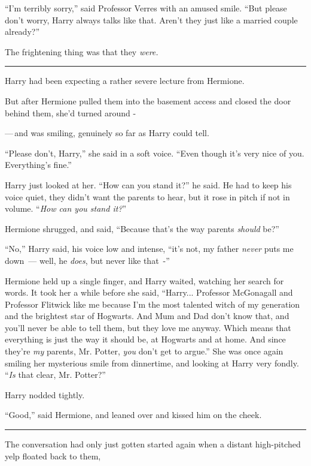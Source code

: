 ``I'm terribly sorry,'' said Professor Verres with an amused smile. ``But please don't worry, Harry always talks like that. Aren't they just like a married couple already?''

The frightening thing was that they \emph{were.}

\begin{center}\rule{3in}{0.4pt}\end{center}

Harry had been expecting a rather severe lecture from Hermione.

But after Hermione pulled them into the basement access and closed the door behind them, she'd turned around -

---\,and was smiling, genuinely so far as Harry could tell.

``Please don't, Harry,'' she said in a soft voice. ``Even though it's very nice of you. Everything's fine.''

Harry just looked at her. ``How can you stand it?'' he said. He had to keep his voice quiet, they didn't want the parents to hear, but it rose in pitch if not in volume. ``\emph{How can you stand it?}''

Hermione shrugged, and said, ``Because that's the way parents \emph{should} be?''

``No,'' Harry said, his voice low and intense, ``it's not, my father \emph{never} puts me down~--- well, he \emph{does}, but never like that~-''

Hermione held up a single finger, and Harry waited, watching her search for words. It took her a while before she said, ``Harry... Professor McGonagall and Professor Flitwick like me because I'm the most talented witch of my generation and the brightest star of Hogwarts. And Mum and Dad don't know that, and you'll never be able to tell them, but they love me anyway. Which means that everything is just the way it should be, at Hogwarts and at home. And since they're \emph{my} parents, Mr. Potter, \emph{you} don't get to argue.'' She was once again smiling her mysterious smile from dinnertime, and looking at Harry very fondly. ``\emph{Is} that clear, Mr. Potter?''

Harry nodded tightly.

``Good,'' said Hermione, and leaned over and kissed him on the cheek.

\begin{center}\rule{3in}{0.4pt}\end{center}

The conversation had only just gotten started again when a distant high-pitched yelp floated back to them,

